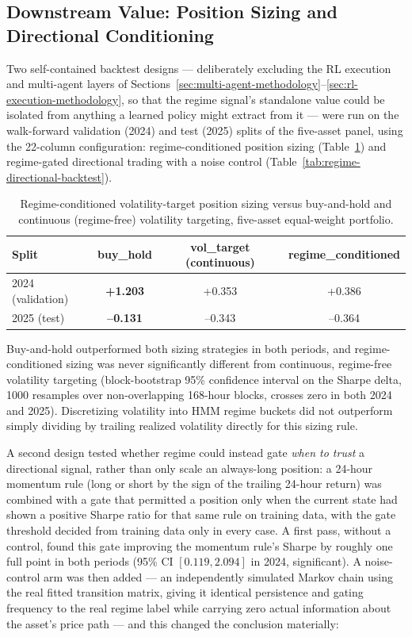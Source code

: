 \subsection{Downstream Value: Position Sizing and Directional Conditioning}
\label{subsec:regime-downstream-value}

Two self-contained backtest designs --- deliberately excluding the RL execution and multi-agent layers of Sections~\ref{sec:multi-agent-methodology}--\ref{sec:rl-execution-methodology}, so that the regime signal's standalone value could be isolated from anything a learned policy might extract from it --- were run on the walk-forward validation (2024) and test (2025) splits of the five-asset panel, using the 22-column configuration: regime-conditioned position sizing (Table~\ref{tab:regime-sizing-backtest}) and regime-gated directional trading with a noise control (Table~\ref{tab:regime-directional-backtest}).

\begin{table}[H]
\centering
\small
\caption{Regime-conditioned volatility-target position sizing versus buy-and-hold and continuous (regime-free) volatility targeting, five-asset equal-weight portfolio.}
\label{tab:regime-sizing-backtest}
\begin{tabular}{|l|c|c|c|}
\hline
\textbf{Split} & \textbf{buy\_hold} & \textbf{vol\_target (continuous)} & \textbf{regime\_conditioned} \\
\hline
2024 (validation) & \textbf{+1.203} & +0.353 & +0.386 \\
\hline
2025 (test) & \textbf{--0.131} & --0.343 & --0.364 \\
\hline
\end{tabular}
\normalsize
\end{table}

Buy-and-hold outperformed both sizing strategies in both periods, and regime-conditioned sizing was never significantly different from continuous, regime-free volatility targeting (block-bootstrap 95\% confidence interval on the Sharpe delta, 1000 resamples over non-overlapping 168-hour blocks, crosses zero in both 2024 and 2025). Discretizing volatility into HMM regime buckets did not outperform simply dividing by trailing realized volatility directly for this sizing rule.

A second design tested whether regime could instead gate \emph{when to trust} a directional signal, rather than only scale an always-long position: a 24-hour momentum rule (long or short by the sign of the trailing 24-hour return) was combined with a gate that permitted a position only when the current state had shown a positive Sharpe ratio for that same rule on training data, with the gate threshold decided from training data only in every case. A first pass, without a control, found this gate improving the momentum rule's Sharpe by roughly one full point in both periods (95\% CI $[0.119, 2.094]$ in 2024, significant). A noise-control arm was then added --- an independently simulated Markov chain using the real fitted transition matrix, giving it identical persistence and gating frequency to the real regime label while carrying zero actual information about the asset's price path --- and this changed the conclusion materially:

